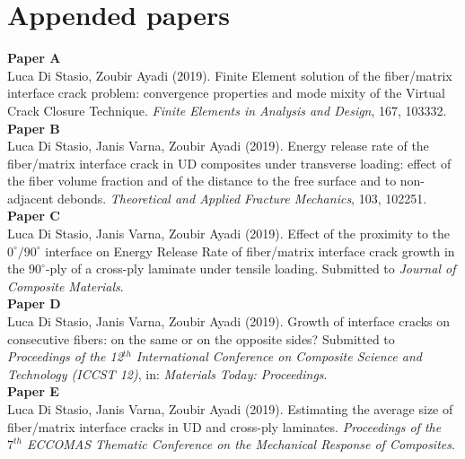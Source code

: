 \section*{Appended papers}
\textbf{Paper A}\\
Luca Di Stasio, Zoubir Ayadi (2019). Finite Element solution of the fiber/matrix interface crack problem: convergence properties and mode mixity of the Virtual Crack Closure Technique. \textit{Finite Elements in Analysis and Design}, 167, 103332.\\[10pt]
\textbf{Paper B}\\
Luca Di Stasio, Janis Varna, Zoubir Ayadi (2019). Energy release rate of the fiber/matrix interface crack in UD composites under transverse loading: effect of the fiber volume fraction and of the distance to the free surface and to non-adjacent debonds. \textit{Theoretical and Applied Fracture Mechanics}, 103, 102251.\\[10pt]
\textbf{Paper C}\\
Luca Di Stasio, Janis Varna, Zoubir Ayadi (2019). Effect of the proximity to the $0^{\circ}/90^{\circ}$ interface on Energy Release Rate of fiber/matrix interface crack growth in the  $90^{\circ}$-ply of a cross-ply laminate under tensile loading. Submitted to \textit{Journal of Composite Materials}.\\[10pt]
\textbf{Paper D}\\
Luca Di Stasio, Janis Varna, Zoubir Ayadi (2019). Growth of interface cracks on consecutive fibers: on the same or on the opposite sides? Submitted to \textit{Proceedings of the 12$^{th}$ International Conference on Composite Science and Technology (ICCST 12)}, in: \textit{Materials Today: Proceedings}.\\[10pt]
\textbf{Paper E}\\
Luca Di Stasio, Janis Varna, Zoubir Ayadi (2019). Estimating the average size of fiber/matrix interface cracks in UD and cross-ply laminates. \textit{Proceedings of the $7^{th}$ ECCOMAS Thematic Conference on the Mechanical Response of Composites}.\\

\newpage

